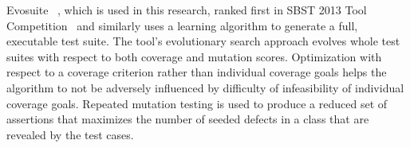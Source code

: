 Evosuite~\cite{fraser:2011:eat:2025113.2025179} , which is used in this research, ranked first in SBST 2013 Tool Competition~\cite{fraser2013a} and similarly uses a learning algorithm to generate a full, executable test suite.  The tool's evolutionary search approach evolves whole test suites with respect to both coverage and mutation scores.  Optimization with respect to a coverage criterion rather than individual coverage goals helps the algorithm to not be adversely influenced by difficulty of infeasibility of individual coverage goals.  Repeated mutation testing is used to produce a reduced set of assertions that maximizes the number of seeded defects in a class that are revealed by the test cases.

